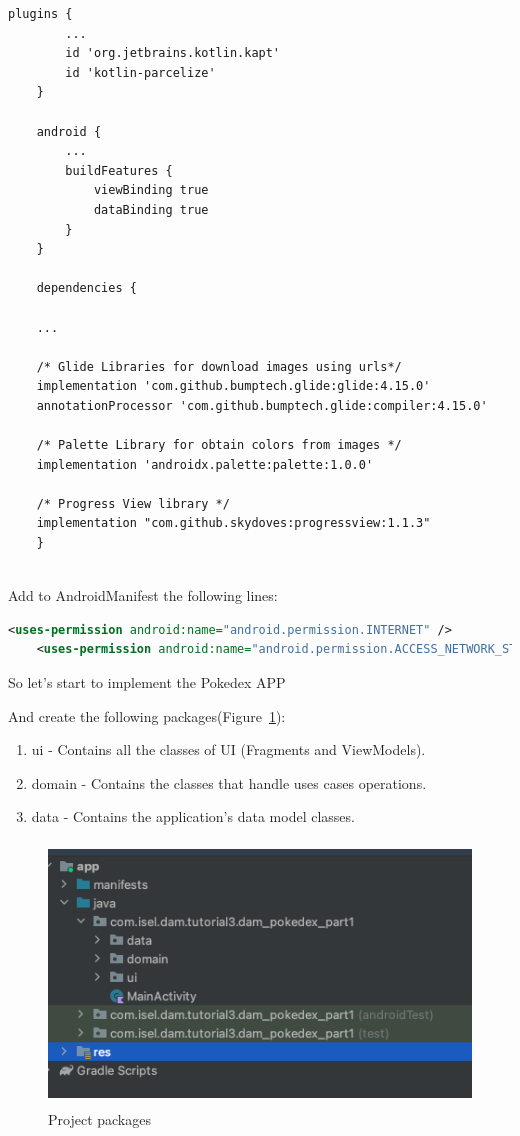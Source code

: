 \documentclass[a4paper, 12pt]{article}
\begin{document}
\begin{lstlisting}[caption={/build.gradle.}, label={code:gradle}, language=XML]
    plugins {
        ...
        id 'org.jetbrains.kotlin.kapt'
        id 'kotlin-parcelize'
    }

    android { 
        ...
        buildFeatures {
            viewBinding true
            dataBinding true
        }
    }

    dependencies {

    ...

    /* Glide Libraries for download images using urls*/
    implementation 'com.github.bumptech.glide:glide:4.15.0'
    annotationProcessor 'com.github.bumptech.glide:compiler:4.15.0'

    /* Palette Library for obtain colors from images */
    implementation 'androidx.palette:palette:1.0.0'

    /* Progress View library */
    implementation "com.github.skydoves:progressview:1.1.3"
    }
    
\end{lstlisting}


Add to AndroidManifest the following lines:

\begin{lstlisting}[caption={Android Manifest}, label={code:android_manifest}, language=XML]
    <uses-permission android:name="android.permission.INTERNET" />
    <uses-permission android:name="android.permission.ACCESS_NETWORK_STATE" />
\end{lstlisting}


So let's start to implement the Pokedex APP 

And create the following packages(Figure~\ref{fig:pj_packges_clean_architecture}):

\begin{enumerate}
	\item ui - Contains all the classes of UI (Fragments and ViewModels).
	\item domain - Contains the classes that handle uses cases operations.
	\item data - Contains the application's data model classes.
\end{enumerate}

\begin{figure}[h]
	\centering
	\includegraphics[height=7cm]{imgs/project/project_packges.png}
	\caption{Project packages}
	\label{fig:pj_packges_clean_architecture}
\end{figure}
\end{document}
